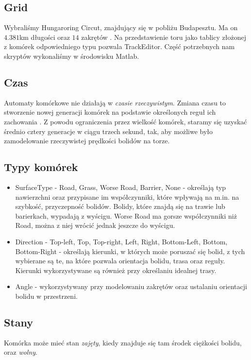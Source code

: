 \documentclass[12p]{extarticle}
\begin{document}
\subsection{Grid} 

Wybraliśmy Hungaroring Circut, znajdujący się w pobliżu Budapesztu. Ma on $4.381$km długości oraz $14$ zakrętów \cite{track}. Na przedstawienie toru jako tablicy złożonej z komórek odpowiedniego typu pozwala TrackEditor. Część potrzebnych nam skryptów wykonaliśmy w środowisku Matlab.

\subsection{Czas}

Automaty komórkowe nie działają w \textit{czasie rzeczywistym}. Zmiana czasu to stworzenie nowej generacji komórek na podstawie określonych reguł ich zachowania \cite{nature}. Z powodu ograniczenia przez wielkość komórek, staramy się uzyskać średnio cztery generacje w ciągu trzech sekund, tak, aby możliwe było zamodelowanie rzeczywistej prędkości bolidów na torze. 

\subsection{Typy komórek}
\begin{itemize}
\item SurfaceType - Road, Grass, Worse Road, Barrier, None - określają typ nawierzchni oraz przypisane im współczynniki, które wpływają na m.in. na szybkość, przyczepność bolidów. Bolidy, które znajdą się na trawie lub barierkach, wypadają z wyścigu. Worse Road ma gorsze współczynniki niż Road, można z niej wrócić jednak jeszcze do wyścigu.
\item Direction -  Top-left, Top, Top-right, Left, Right, Bottom-Left, Bottom, Bottom-Right - określają kierunki, w których może poruszać się bolid, z tych wybierane są te, na które pozwala orientacja bolidu, trasa oraz reguły. Kierunki wykorzystywane są również przy określaniu idealnej trasy.
\item Angle -  wykorzystywany przy modelowaniu zakrętów oraz ustalaniu orientacji bolidu w przestrzeni.
\end{itemize}

\subsection{Stany}

Komórka może mieć stan \textit{zajęty}, kiedy znajduje się tam środek ciężkości bolidu, oraz \textit{wolny}. 
\end{document}
